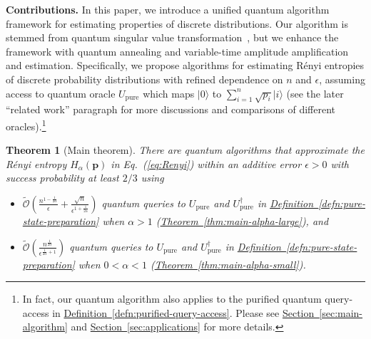 \documentclass[journal]{IEEEtran}
\newtheorem{theorem}{Theorem}
\newcommand{\eq}[1]{Eq.~(\ref{eq:#1})}
\newcommand{\thm}[1]{\hyperref[thm:#1]{Theorem~\ref*{thm:#1}}}
\newcommand{\defn}[1]{\hyperref[defn:#1]{Definition~\ref*{defn:#1}}}
\renewcommand{\sec}[1]{\hyperref[sec:#1]{Section~\ref*{sec:#1}}}
\renewcommand{\ket}[1]{|#1\rangle}
\begin{document}
\vspace{3mm}
\noindent
\textbf{Contributions.}
In this paper, we introduce a unified quantum algorithm framework for estimating properties of discrete distributions. Our algorithm is stemmed from quantum singular value transformation~\cite{gilyen2019singular}, but we enhance the framework with quantum annealing and variable-time amplitude amplification and estimation. Specifically, we propose algorithms for estimating R{\'e}nyi entropies of discrete probability distributions with refined dependence on $n$ and $\epsilon$, assuming access to quantum oracle $U_{\mathrm{pure}}$ which maps $\ket{0}$ to $\sum_{i=1}^n \sqrt{p_i} \ket{i}$ (see the later ``related work'' paragraph for more discussions and comparisons of different oracles).\footnote{In fact, our quantum algorithm also applies to the purified quantum query-access in \defn{purified-query-access}. Please see \sec{main-algorithm} and \sec{applications} for more details.}

\begin{theorem}[Main theorem]\label{thm:main}
There are quantum algorithms that approximate the R{\'e}nyi entropy $H_\alpha(\mathbf{p})$ in \eq{Renyi} within an additive error $\epsilon>0$ with success probability at least $2/3$ using
\begin{itemize}[leftmargin=15pt]
    \item $\widetilde{\mathcal{O}}\left(\frac{n^{1-\frac{1}{2\alpha}}}{\epsilon} + \frac{\sqrt{n}}{\epsilon^{1+\frac{1}{2\alpha}}}\right)$
 quantum queries to $U_{\mathrm{pure}}$ and $U_{\mathrm{pure}}^\dagger$ in \defn{pure-state-preparation} when $\alpha>1$ (\thm{main-alpha-large}), and
    \item $\widetilde{\mathcal{O}}\left(\frac{n^{\frac{1}{2\alpha}}}{\epsilon^{\frac{1}{2\alpha}+1}}\right)$
 quantum queries to $U_{\mathrm{pure}}$ and $U_{\mathrm{pure}}^\dagger$ in \defn{pure-state-preparation} when $0<\alpha<1$ (\thm{main-alpha-small}).
\end{itemize}
\end{theorem}
\end{document}
